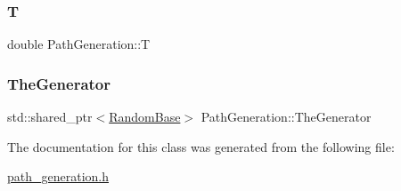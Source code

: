 \hypertarget{classPathGeneration_a5c62e982138106c6846600a2f484d6d3}{}\label{classPathGeneration_a5c62e982138106c6846600a2f484d6d3} 
\subsubsection{\texorpdfstring{T}{T}}
{\footnotesize\ttfamily double Path\+Generation\+::T\hspace{0.3cm}{\ttfamily [protected]}}

\hypertarget{classPathGeneration_abc5192a7165581ac6943ad4672a0cbd8}{}\label{classPathGeneration_abc5192a7165581ac6943ad4672a0cbd8} 
\subsubsection{\texorpdfstring{The\+Generator}{TheGenerator}}
{\footnotesize\ttfamily std\+::shared\+\_\+ptr$<$\hyperlink{classRandomBase}{Random\+Base}$>$ Path\+Generation\+::\+The\+Generator\hspace{0.3cm}{\ttfamily [protected]}}



The documentation for this class was generated from the following file\+:\begin{DoxyCompactItemize}
\item 
\hyperlink{path__generation_8h}{path\+\_\+generation.\+h}\end{DoxyCompactItemize}
